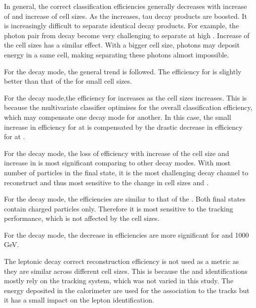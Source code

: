 In general,  the correct classification efficiencies generally decreases with increase of \sqrtS and increase of \ECAL cell sizes. As the \sqrtS increases, tau decay products are boosted. It is increasingly difficult to separate identical decay products. For example, the photon pair from \Ppizero decay become very challenging to separate at high \sqrtS. Increase of the \ECAL cell sizes has a similar effect. With a bigger cell size, photons may deposit energy in a same cell, making separating these photons  almost impossible.

For the \decayPionShort decay mode, the general trend is followed. The efficiency for  is slightly better than that of the  for small cell sizes.

For the \decayRhoShort decay mode,the efficiency for   increases as the cell sizes increases. This is because the multivariate classifier optimises for the overall classification efficiency, which may compensate one decay mode for another. In this case, the small increase in efficiency for \decayRhoShort at  is compensated by the drastic decrease in efficiency for \decayAiPhotonShort at  .

For the \decayAiPhotonShort decay mode, the loss of efficiency with increase of the cell size and increase in \sqrtS is most significant comparing to other decay modes. With most number of particles in the final state, it is the most challenging decay channel to reconstruct and thus most sensitive to the change in cell sizes and \sqrtS.

For the \decayAiPionShort decay mode, the efficiencies are similar to that of the \decayPionShort. Both final states contain charged particles only. Therefore it is most sensitive to the tracking performance, which is not affected by the \ECAL cell sizes.

For the \decayThreePionPhotonShort decay mode, the decrease in efficiencies are more significant for  and 1000\,GeV.

The leptonic decay  correct reconstruction efficiency is not used as a metric as they are similar across different \ECAL cell sizes. This is because the \Pepm and \Pgmpm identifications mostly rely on the tracking system, which was not varied in this study. The energy deposited in the calorimeter are used for the association to the tracks but it has a small impact on the lepton identification.


